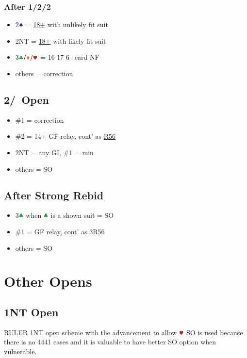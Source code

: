 \documentclass{article}
\begin{document}
\begin{multicols}{2}
\begin{CJK*}{UTF8}{gt}
\subsubsection{After 1\CCC/2\DDD/2\HHH}\label{sec:1s-escape}
\begin{itemize}
    \item 2$\sss$ = \hyperref[sec:2suit-strong-rebid]{18+} with unlikely fit suit
    \item 2NT = \hyperref[sec:2suit-strong-rebid]{18+} with likely fit suit
    \item 3$\ccc/\ddd/\hhh$ = 16-17 6+card NF
    \item others = correction
\end{itemize}

\subsection{2\CCC/\DDD\ Open}\label{sec:2cd}
\begin{itemize}
    \item \#1 = correction
    \item \#2 = 14+ GF relay, cont' as \hyperref[sec:nlm3r56]{R56}
    \item 2NT = any GI, \#1 = min
    \item others = SO
\end{itemize}

\subsection{After Strong Rebid}\label{sec:2suit-strong-rebid}
\begin{itemize}
    \item 3$\ccc$ when $\ccc$ is a shown suit = SO
    \item \#1 = GF relay, cont' as \hyperref[sec:nlm3r56]{3R56}
    \item others = SO
\end{itemize}

\section{Other Opens}
\subsection{1NT Open}\label{sec:1n}
RULER 1NT open scheme with the advancement to allow $\hhh$ SO is used because there is no 4441 cases and it is valuable to have better SO option when vulnerable.


\end{CJK*}
\end{multicols}
\end{document}

